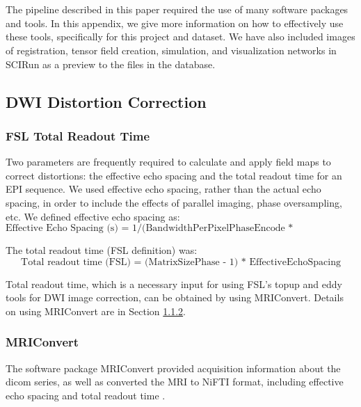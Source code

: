 
\section{ } %
\label{sec:Appendix}

The pipeline described in this paper required the use of many software packages and tools. In this appendix, we give more information on how to effectively use these tools, specifically for this project and dataset. We have also included images of registration, tensor field creation, simulation, and visualization networks in SCIRun as a preview to the files in the database.

\subsection{DWI Distortion Correction}
\label{sec:distortion}

\subsubsection{FSL Total Readout Time}

Two parameters are frequently required to calculate and apply field maps to correct distortions: the effective echo spacing and the total readout time for an EPI sequence.  We used effective echo spacing, rather than the actual echo spacing, in order to include the effects of parallel imaging, phase oversampling, etc. We defined effective echo spacing as:
\[
\text{Effective Echo Spacing (s) = 1/(BandwidthPerPixelPhaseEncode * MatrixSizePhase)}
\]

The total readout time (FSL definition) was:
\[
\text{Total readout time (FSL) = (MatrixSizePhase - 1) * EffectiveEchoSpacing}
\]

Total readout time, which is a necessary input for using FSL's topup and eddy tools for DWI image correction, can be obtained by using MRIConvert. Details on using MRIConvert are in Section \ref{sec:MRIConvert}.

\subsubsection{MRIConvert}
\label{sec:MRIConvert}

The software package MRIConvert provided acquisition information about the dicom series, as well as converted the MRI to NiFTI format, including effective echo spacing and total readout time \cite{ref:mriconvert}. 

